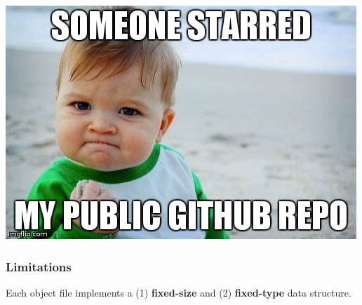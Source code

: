 \begin{frame}

\includegraphics[width=\textwidth]{memes/github-star}

\end{frame}


\begin{frame}

\frametitle{Limitations}

\begin{center}

Each object file implements a (1) \textbf{fixed-size} and (2)
\textbf{fixed-type} data structure.

\end{center}

\end{frame}
